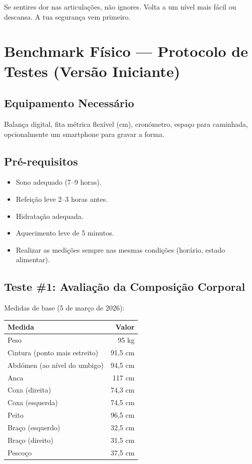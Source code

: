 \documentclass[12pt,a4paper]{scrartcl}
\newcommand{\tipbox}[1]{\begin{tcolorbox}[colback=tipbg, colframe=primary, title=\textbf{Dica}] #1 \end{tcolorbox}}
\begin{document}
\tipbox{Se sentires dor nas articulações, não ignores. Volta a um nível mais fácil ou descansa. A tua segurança vem primeiro.}

\section{Benchmark Físico — Protocolo de Testes (Versão Iniciante)}
\subsection{Equipamento Necessário}
Balança digital, fita métrica flexível (cm), cronómetro, espaço para caminhada, opcionalmente um smartphone para gravar a forma.

\subsection{Pré-requisitos}
\begin{itemize}
    \item Sono adequado (7–9 horas).
    \item Refeição leve 2–3 horas antes.
    \item Hidratação adequada.
    \item Aquecimento leve de 5 minutos.
    \item Realizar as medições sempre nas mesmas condições (horário, estado alimentar).
\end{itemize}

\subsection{Teste \#1: Avaliação da Composição Corporal}
Medidas de base (5 de março de 2026):

\begin{table}[h]
\centering
\begin{tabular}{lr}
\toprule
Medida & Valor \\
\midrule
Peso & 95 kg \\
Cintura (ponto mais estreito) & 91,5 cm \\
Abdómen (ao nível do umbigo) & 94,5 cm \\
Anca & 117 cm \\
Coxa (direita) & 74,3 cm \\
Coxa (esquerda) & 74,5 cm \\
Peito & 96,5 cm \\
Braço (esquerdo) & 32,5 cm \\
Braço (direito) & 31,5 cm \\
Pescoço & 37,5 cm \\
\bottomrule
\end{tabular}
\end{table}
\end{document}
